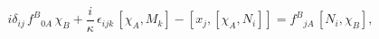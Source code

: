\begin{equation}\label{d4}
 i\delta_{ij}\, f^{B}{}_{0 A}\, \chi_B
+\frac{i}\kappa\,\epsilon_{ijk}\, [\chi_A,M_k]- [x_j, [\chi_A, N_i]]
=f^{B}{}_{j A}\, [N_i, \chi_B],
\end{equation}

